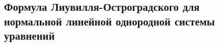 



\subsection*{Формула Лиувилля-Остроградского для нормальной линейной однородной системы уравнений}

